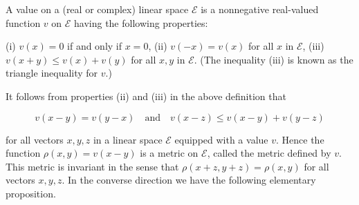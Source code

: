 A value on a (real or complex) linear space $\mathcal{E}$ is a nonnegative real-valued function $v$ on $\mathcal{E}$ having the following properties:

(i) $v(x) = 0$ if and only if $x = 0$,
(ii) $v(-x) = v(x)$ for all $x$ in $\mathcal{E}$,
(iii) $v(x + y) \leq v(x) + v(y)$ for all $x, y$ in $\mathcal{E}$.
(The inequality (iii) is known as the triangle inequality for $v$.)

It follows from properties (ii) and (iii) in the above definition that

$$v(x - y) = v(y - x) \quad \text{and} \quad v(x - z) \leq v(x - y) + v(y - z)$$

for all vectors $x, y, z$ in a linear space $\mathcal{E}$ equipped with a value $v$. Hence the function $\rho(x, y) = v(x - y)$ is a metric on $\mathcal{E}$, called the metric defined by $v$. This metric is invariant in the sense that $\rho(x + z, y + z) = \rho(x, y)$ for all vectors $x, y, z$. In the converse direction we have the following elementary proposition.
